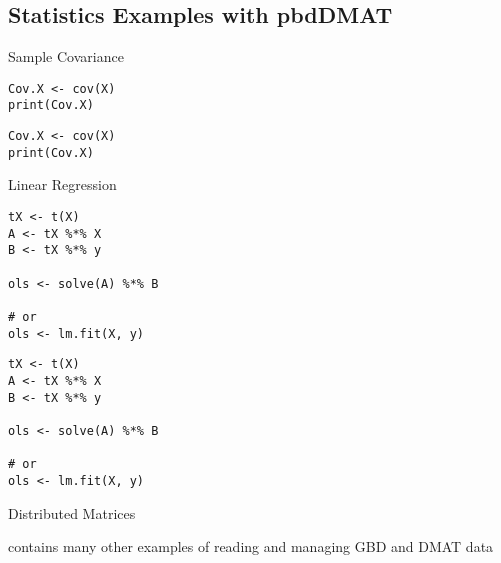 \subsection{Statistics Examples with pbdDMAT}

\begin{frame}[fragile]
  \begin{exampleblock}{Sample Covariance}\pause
\begin{lstlisting}[title=Serial Code]
Cov.X <- cov(X)
print(Cov.X)
\end{lstlisting}

\begin{lstlisting}[title=Parallel Code]
Cov.X <- cov(X)
print(Cov.X)
\end{lstlisting}
  \end{exampleblock}
\end{frame}

\begin{frame}
  \begin{exampleblock}{Linear Regression}\pause
\begin{lstlisting}[title=Serial Code]
tX <- t(X)
A <- tX %*% X
B <- tX %*% y

ols <- solve(A) %*% B

# or
ols <- lm.fit(X, y)
\end{lstlisting}
  
\begin{lstlisting}[title=Parallel Code]
tX <- t(X)
A <- tX %*% X
B <- tX %*% y

ols <- solve(A) %*% B

# or
ols <- lm.fit(X, y)
\end{lstlisting}
  \end{exampleblock}
\end{frame}


\begin{frame}
  \begin{block}{Distributed Matrices}\pause
  \begin{center}
     contains many other examples of reading and managing GBD and DMAT data
  \end{center}
  \end{block}
\end{frame}



